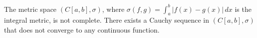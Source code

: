 The metric space $(C[a,b], \sigma)$, where $\sigma(f, g) = \int_a^b |f(x) - g(x)| \, dx$ is the integral metric, is not complete. There exists a Cauchy sequence in $(C[a,b], \sigma)$ that does not converge to any continuous function.
